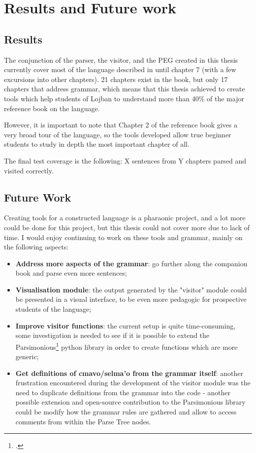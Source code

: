 \chapter{Results and Future work}

\vspace{0.5cm}

\section{Results}

The conjunction of the parser, the visitor, and the PEG created in this thesis currently cover most of the language described in
 until chapter 7 (with a few excursions into other chapters). 21 chapters exist in the book,
but only 17 chapters that address grammar, which means that this thesis achieved to create tools which help students of
Lojban to understand more than 40\% of the major reference book on the language.\newline

However, it is important to note that Chapter 2 of the reference book gives a very broad tour of the language, so the tools
developed allow true beginner students to study in depth the most important chapter of all.\newline

The final test coverage is the following: X sentences from Y chapters parsed and visited correctly.

\newpage

\section{Future Work}

Creating tools for a constructed language is a pharaonic project, and a lot more could be done for this project,
but this thesis could not cover more due to lack of time. I would enjoy continuing to work on these tools and grammar,
mainly on the following aspects:

\begin{itemize}
\item \textbf{Address more aspects of the grammar}: go further along the companion book and parse even more sentences;
\item \textbf{Visualisation module}: the output generated by the "visitor" module could be presented in a visual interface,
to be even more pedagogic for prospective students of the language;
\item \textbf{Improve visitor functions}: the current setup is quite time-consuming, some investigation is needed to see if
it is possible to extend the Parsimonious\footcite{parsimonious} python library in order to create functions which are more generic;
\item \textbf{Get definitions of cmavo/selma'o from the grammar itself}: another frustration encountered during the development of
the visitor module was the need to duplicate definitions from the grammar into the code - another possible extension and
open-source contribution to the Parsimonious library could be modify how the grammar rules are gathered and allow to access
comments from within the Parse Tree nodes.
\end{itemize}